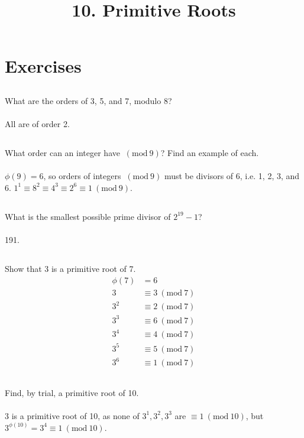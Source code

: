 \documentclass{article} \usepackage{amsmath}
\begin{document}
\newcommand{\Z}{\mathbb{Z}}
\newcommand{\s}{\sigma}
\newcommand{\p}{\phi}
\newcommand{\Mod}[1]{\ (\mathrm{mod}\ #1)}

\title{10. Primitive Roots}
\section{Exercises}

\subsection{}
What are the orders of 3, 5, and 7, modulo 8?\\~\\
All are of order 2.

\subsection{}
What order can an integer have $\Mod{9}$? Find an example of each.\\~\\
$\p(9) = 6$, so orders of integers $\Mod{9}$ must be divisors of 6,
i.e. 1, 2, 3, and 6.
$1^1 \equiv 8^2 \equiv 4^3 \equiv 2^6 \equiv 1 \Mod{9}$.

\subsection{}
What is the smallest possible prime divisor of $2^{19} - 1$?\\~\\
191.

\subsection{}
Show that 3 is a primitive root of 7.
\begin{align*}
    \p(7) &= 6\\
    3 &\equiv 3 \Mod{7}\\
    3^2 &\equiv 2 \Mod{7}\\
    3^3 &\equiv 6 \Mod{7}\\
    3^4 &\equiv 4 \Mod{7}\\
    3^5 &\equiv 5 \Mod{7}\\
    3^6 &\equiv 1 \Mod{7}
\end{align*}

\subsection{}
Find, by trial, a primitive root of 10.\\~\\
3 is a primitive root of 10, as none of $3^1, 3^2, 3^3$ are $\equiv 1 \Mod{10}$,
but $3^{\p(10)} = 3^4 \equiv 1 \Mod{10}$.
\end{document}
